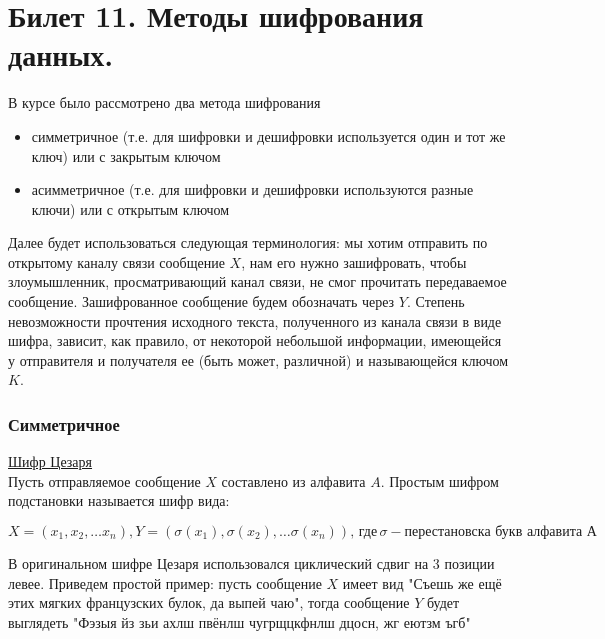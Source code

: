 \newpage
\section {Билет 11. Методы шифрования данных.}
В курсе было рассмотрено два метода шифрования 
\begin {itemize}
\item симметричное (т.е. для шифровки и дешифровки используется один и тот же ключ) или с закрытым ключом 
\item асимметричное (т.е. для шифровки и дешифровки используются разные ключи) или с открытым ключом
\end {itemize}

Далее будет использоваться следующая терминология: мы хотим отправить по открытому каналу связи сообщение $X$, нам его нужно зашифровать, чтобы злоумышленник, просматривающий канал связи, не смог прочитать передаваемое сообщение. Зашифрованное сообщение будем обозначать через $Y$. Степень невозможности прочтения исходного текста, полученного из канала связи в виде шифра, зависит, как правило, от некоторой небольшой информации, имеющейся у отправителя и получателя ее (быть может, различной) и называющейся ключом $K$.

\subsubsection{Симметричное}
\href{https://clck.ru/9KE6e}{Шифр Цезаря} \\
Пусть отправляемое сообщение $X$ составлено из алфавита $A$. Простым шифром подстановки называется шифр вида:

$$ X = (x_1, x_2, \dots x_n), Y = (\sigma (x_1), \sigma(x_2), \dots \sigma(x_n)), \, \text{где}\, \sigma - \text {перестановска букв алфавита А} $$

В оригинальном шифре Цезаря использовался циклический сдвиг на 3 позиции левее. Приведем простой пример: пусть сообщение $X$ имеет вид "Съешь же ещё этих мягких французских булок, да выпей чаю", тогда сообщение $Y$ будет выглядеть "Фэзыя йз зьи ахлш пвёнлш чугрщцкфнлш дцосн, жг еютзм ъгб" \\

